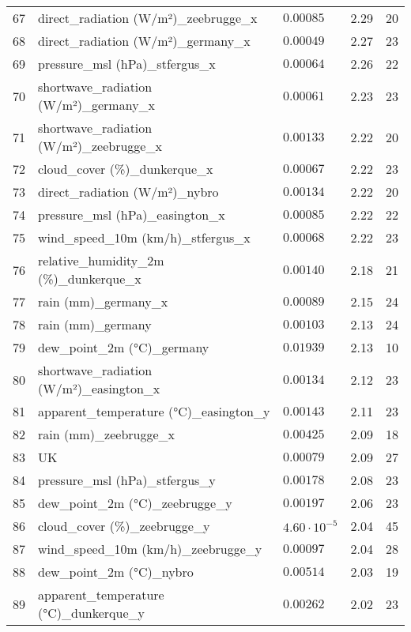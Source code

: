\begin{table}[H]
\begin{tabular}{r l l l l}
        67 & direct\_radiation (W/m²)\_zeebrugge\_x & $0.00085$ & 2.29 & 20 \\
        68 & direct\_radiation (W/m²)\_germany\_x & $0.00049$ & 2.27 & 23 \\
        69 & pressure\_msl (hPa)\_stfergus\_x & $0.00064$ & 2.26 & 22 \\
        70 & shortwave\_radiation (W/m²)\_germany\_x & $0.00061$ & 2.23 & 23 \\
        71 & shortwave\_radiation (W/m²)\_zeebrugge\_x & $0.00133$ & 2.22 & 20 \\
        72 & cloud\_cover (\%)\_dunkerque\_x & $0.00067$ & 2.22 & 23 \\
        73 & direct\_radiation (W/m²)\_nybro & $0.00134$ & 2.22 & 20 \\
        74 & pressure\_msl (hPa)\_easington\_x & $0.00085$ & 2.22 & 22 \\
        75 & wind\_speed\_10m (km/h)\_stfergus\_x & $0.00068$ & 2.22 & 23 \\
        76 & relative\_humidity\_2m (\%)\_dunkerque\_x & $0.00140$ & 2.18 & 21 \\
        77 & rain (mm)\_germany\_x & $0.00089$ & 2.15 & 24 \\
        78 & rain (mm)\_germany & $0.00103$ & 2.13 & 24 \\
        79 & dew\_point\_2m (°C)\_germany & $0.01939$ & 2.13 & 10 \\
        80 & shortwave\_radiation (W/m²)\_easington\_x & $0.00134$ & 2.12 & 23 \\
        81 & apparent\_temperature (°C)\_easington\_y & $0.00143$ & 2.11 & 23 \\
        82 & rain (mm)\_zeebrugge\_x & $0.00425$ & 2.09 & 18 \\
        83 & UK & $0.00079$ & 2.09 & 27 \\
        84 & pressure\_msl (hPa)\_stfergus\_y & $0.00178$ & 2.08 & 23 \\
        85 & dew\_point\_2m (°C)\_zeebrugge\_y & $0.00197$ & 2.06 & 23 \\
        86 & cloud\_cover (\%)\_zeebrugge\_y & $4.60 \cdot 10^{-5}$ & 2.04 & 45 \\
        87 & wind\_speed\_10m (km/h)\_zeebrugge\_y & $0.00097$ & 2.04 & 28 \\
        88 & dew\_point\_2m (°C)\_nybro & $0.00514$ & 2.03 & 19 \\
        89 & apparent\_temperature (°C)\_dunkerque\_y & $0.00262$ & 2.02 & 23 \\

\end{tabular}
\end{table}
